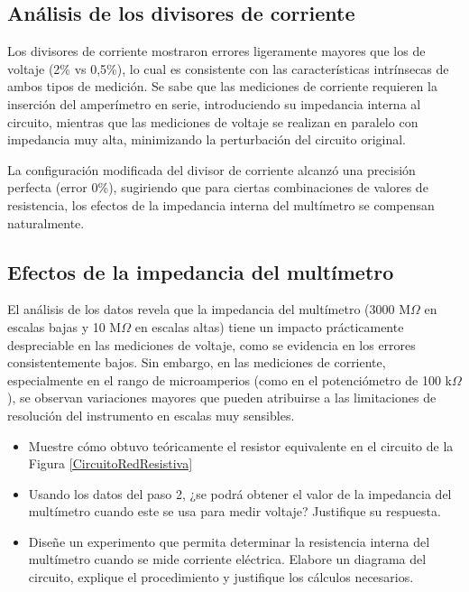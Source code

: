 \documentclass[12pt,a4paper]{article}
\begin{document}
\subsection{Análisis de los divisores de corriente}
Los divisores de corriente mostraron errores ligeramente mayores que los de voltaje (2\% vs 0,5\%), lo cual es consistente con las características intrínsecas de ambos tipos de medición. Se sabe que las mediciones de corriente requieren la inserción del amperímetro en serie, introduciendo su impedancia interna al circuito, mientras que las mediciones de voltaje se realizan en paralelo con impedancia muy alta, minimizando la perturbación del circuito original.

La configuración modificada del divisor de corriente alcanzó una precisión perfecta (error 0\%), sugiriendo que para ciertas combinaciones de valores de resistencia, los efectos de la impedancia interna del multímetro se compensan naturalmente.

\subsection{Efectos de la impedancia del multímetro}
El análisis de los datos revela que la impedancia del multímetro (3000 M$\Omega$ en escalas bajas y 10 M$\Omega$ en escalas altas) tiene un impacto prácticamente despreciable en las mediciones de voltaje, como se evidencia en los errores consistentemente bajos. Sin embargo, en las mediciones de corriente, especialmente en el rango de microamperios (como en el potenciómetro de 100 k$\Omega$), se observan variaciones mayores que pueden atribuirse a las limitaciones de resolución del instrumento en escalas muy sensibles.

\begin{itemize}
    \item Muestre cómo obtuvo teóricamente el resistor equivalente en el circuito de la Figura \ref{CircuitoRedResistiva}
    \item Usando los datos del paso 2, ¿se podrá obtener el valor de la impedancia del multímetro cuando este se usa para medir voltaje? Justifique su respuesta.
    \item Diseñe un experimento que permita determinar la resistencia interna del multímetro cuando se mide corriente eléctrica. Elabore un diagrama del circuito, explique el procedimiento y justifique los cálculos necesarios.
\end{itemize}
\end{document}
